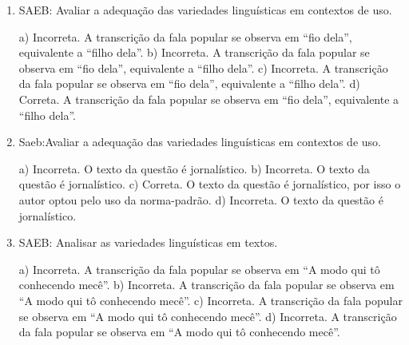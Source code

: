 
\begin{enumerate}

\item
SAEB: Avaliar a adequação das variedades linguísticas em contextos de uso.

a) Incorreta. A transcrição da fala popular se observa em ``fio dela'', equivalente a ``filho dela''.
b) Incorreta. A transcrição da fala popular se observa em ``fio dela'', equivalente a ``filho dela''.
c) Incorreta. A transcrição da fala popular se observa em ``fio dela'', equivalente a ``filho dela''.
d) Correta. A transcrição da fala popular se observa em ``fio dela'', equivalente a ``filho dela''.

\item
Saeb:Avaliar a adequação das variedades linguísticas em contextos de
uso.

a) Incorreta. O texto da questão é jornalístico. 
b) Incorreta. O texto da questão é jornalístico. 
c) Correta. O texto da questão é jornalístico, por isso o autor optou pelo uso da norma-padrão. 
d) Incorreta. O texto da questão é jornalístico.

\item
SAEB: Analisar as variedades linguísticas em textos.

a) Incorreta. A transcrição da fala popular se observa em ``A modo qui tô conhecendo mecê''.
b) Incorreta. A transcrição da fala popular se observa em ``A modo qui tô conhecendo mecê''. 
c) Incorreta. A transcrição da fala popular se observa em ``A modo qui tô conhecendo mecê''. 
d) Incorreta. A transcrição da fala popular se observa em ``A modo qui tô conhecendo mecê''.

\end{enumerate}


